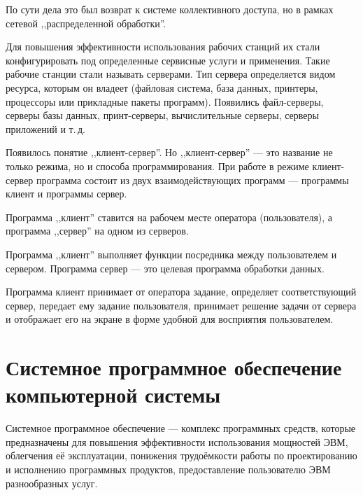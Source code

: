 \documentclass[a5paper, 10pt, notitlepage, pdftex,headsepline]{scrartcl}
\begin{document}
    По сути дела это был возврат к системе коллективного доступа, но в
    рамках сетевой ,,распределенной обработки''.

    Для повышения эффективности использования рабочих станций их стали
    конфигурировать под определенные сервисные услуги и применения.
    Такие рабочие станции стали называть серверами.
    Тип сервера определяется видом ресурса, которым он владеет (файловая
    система, база данных, принтеры, процессоры или прикладные пакеты программ).
    Появились файл-серверы, серверы базы данных, принт-серверы,
    вычислительные серверы, серверы приложений и т.\,д.

    Появилось понятие ,,клиент-сервер''. Но ,,клиент-сервер'' --- это
    название не только режима, но и способа программирования.
    При работе в режиме клиент-сервер программа состоит из двух
    взаимодействующих программ --- программы клиент и программы сервер.

    Программа ,,клиент'' ставится на рабочем месте оператора
    (пользователя), а программа ,,сервер'' на одном из серверов.

    Программа ,,клиент'' выполняет функции посредника между пользователем и сервером.
    Программа сервер --- это целевая программа обработки данных.

    Программа клиент принимает от оператора задание, определяет
    соответствующий сервер, передает ему задание пользователя, принимает
    решение задачи от сервера и отображает его на экране в форме удобной
    для восприятия пользователем.
\section{Системное программное обеспечение компьютерной системы}
  Системное программное обеспечение --- комплекс программных средств,
  которые предназначены для повышения эффективности использования
  мощностей ЭВМ, облегчения её эксплуатации, понижения трудоёмкости
  работы по проектированию и исполнению программных продуктов,
  предоставление пользователю ЭВМ разнообразных услуг.
\end{document}
